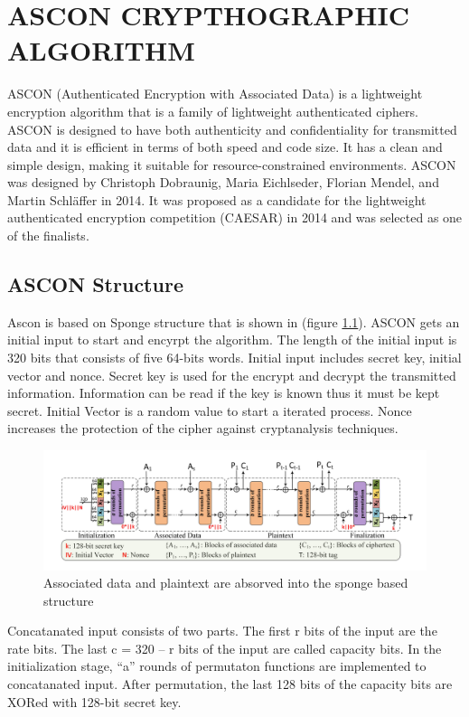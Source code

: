 \clearpage
\chapter{ASCON CRYPTHOGRAPHIC ALGORITHM }\label{Chascon}
ASCON (Authenticated Encryption with Associated Data) is a lightweight encryption algorithm that is a family of lightweight authenticated ciphers. ASCON is designed to have both authenticity and confidentiality for transmitted data and it is efficient in terms of both speed and code size. It has a clean and simple design, making it suitable for resource-constrained environments. 
ASCON was designed by Christoph Dobraunig, Maria Eichlseder, Florian Mendel, and Martin Schläffer in 2014. It was proposed as a candidate for the lightweight authenticated encryption competition (CAESAR) in 2014 and was selected as one of the finalists.

\section{ASCON Structure}
Ascon is based on Sponge structure that is shown in (figure \ref{fig:sbox_structure}). ASCON gets an initial input to start and encyrpt the algorithm. The length of the initial input is 320 bits that consists of five 64-bits words. Initial input includes secret key, initial vector and nonce. Secret key is used for the encrypt and decrypt the transmitted information. Information can be read if the key is known thus it must be kept secret. Initial Vector is a random value to start a iterated process. Nonce increases the protection of the cipher against cryptanalysis techniques. 

\begin{figure}
    \centering
    \includegraphics[scale = 0.4]{ascon_sbox/s_box_structure.png}
    \caption{Associated data and plaintext are absorved into the sponge based structure}
    \label{fig:sbox_structure}
\end{figure}
Concatanated input consists of two parts. The first r bits of the input are the rate bits. The last c = 320 – r bits of the input are called capacity bits. In the initialization stage, “a” rounds of permutaton functions are implemented to concatanated input. After permutation, the last 128 bits of the capacity bits are XORed with 128-bit secret key. 

